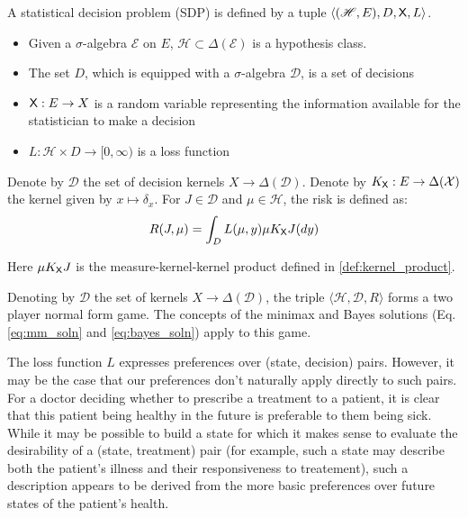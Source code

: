 \begin{definition}
A statistical decision problem (SDP) is defined by a tuple $\langle (\mathscr{H},E), D, \mathsf{X}, L\rangle$.
\begin{itemize}
    \item Given a $\sigma$-algebra $\mathcal{E}$ on $E$, $\mathscr{H}\subset\Delta(\mathcal{E})$ is a hypothesis class.
    \item The set $D$, which is equipped with a $\sigma$-algebra $\mathcal{D}$, is a set of decisions
    \item $\mathsf{X}:E\to X$ is a random variable representing the information available for the statistician to make a decision
    \item $L:\mathcal{H}\times D\to [0,\infty)$ is a loss function
\end{itemize}

Denote by $\mathscr{D}$ the set of decision kernels $X\to \Delta(\mathcal{D})$. Denote by $K_{\mathsf{X}}:E\to \Delta(\mathcal{X})$ the kernel given by $x\mapsto \delta_x$. For $J\in \mathscr{D}$ and $\mu\in \mathcal{H}$, the risk is defined as:
\begin{align}
    R(J,\mu) = \int_D L(\mu,y) \mu K_{\mathsf{X}} J(dy)
\end{align}

Here $\mu K_{\mathsf{X}} J$ is the measure-kernel-kernel product defined in \ref{def:kernel_product}.

Denoting by $\mathscr{D}$  the set of kernels $X\to \Delta(\mathcal{D})$, the triple $\langle \mathscr{H}, \mathscr{D}, R\rangle$ forms a two player normal form game. The concepts of the minimax and Bayes solutions (Eq. \ref{eq:mm_soln} and \ref{eq:bayes_soln}) apply to this game.
\end{definition}

The loss function $L$ expresses preferences over (state, decision) pairs. However, it may be the case that our preferences don't naturally apply directly to such pairs. For a doctor deciding whether to prescribe a treatment to a patient, it is clear that this patient being healthy in the future is preferable to them being sick. While it may be possible to build a state for which it makes sense to evaluate the desirability of a (state, treatment) pair (for example, such a state may describe both the patient's illness and their responsiveness to treatement), such a description appears to be derived from the more basic preferences over future states of the patient's health.

